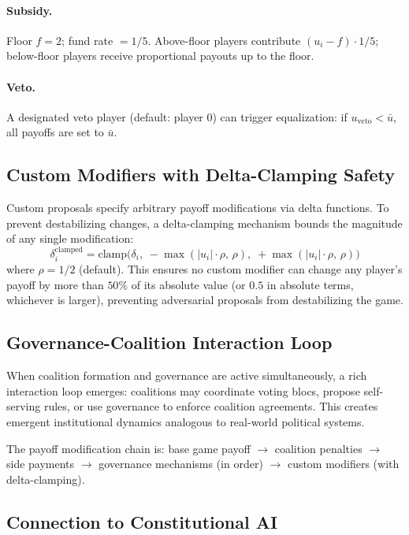 \paragraph{Subsidy.} Floor $f = 2$; fund rate $= 1/5$. Above-floor
players contribute $(u_i - f) \cdot 1/5$; below-floor players receive
proportional payouts up to the floor.

\paragraph{Veto.} A designated veto player (default: player $0$) can
trigger equalization: if $u_{\text{veto}} < \bar{u}$, all payoffs are
set to $\bar{u}$.

\subsection{Custom Modifiers with Delta-Clamping Safety}
\label{sec:delta-clamping}

Custom proposals specify arbitrary payoff modifications via delta functions.
To prevent destabilizing changes, a delta-clamping mechanism bounds the
magnitude of any single modification:
\[
\delta_i^{\text{clamped}} = \text{clamp}\!\bigl(\delta_i,\;
  -\max(|u_i| \cdot \rho,\, \rho),\;
  +\max(|u_i| \cdot \rho,\, \rho)\bigr)
\]
where $\rho = 1/2$ (default). This ensures no custom modifier can change
any player's payoff by more than $50\%$ of its absolute value (or $0.5$
in absolute terms, whichever is larger), preventing adversarial proposals
from destabilizing the game.

\subsection{Governance-Coalition Interaction Loop}
\label{sec:gov-coalition}

When coalition formation and governance are active simultaneously, a rich
interaction loop emerges: coalitions may coordinate voting blocs, propose
self-serving rules, or use governance to enforce coalition agreements. This
creates emergent institutional dynamics analogous to real-world political
systems.

The payoff modification chain is: base game payoff $\to$ coalition penalties
$\to$ side payments $\to$ governance mechanisms (in order) $\to$ custom
modifiers (with delta-clamping).

\subsection{Connection to Constitutional AI}
\label{sec:constitutional-ai}


